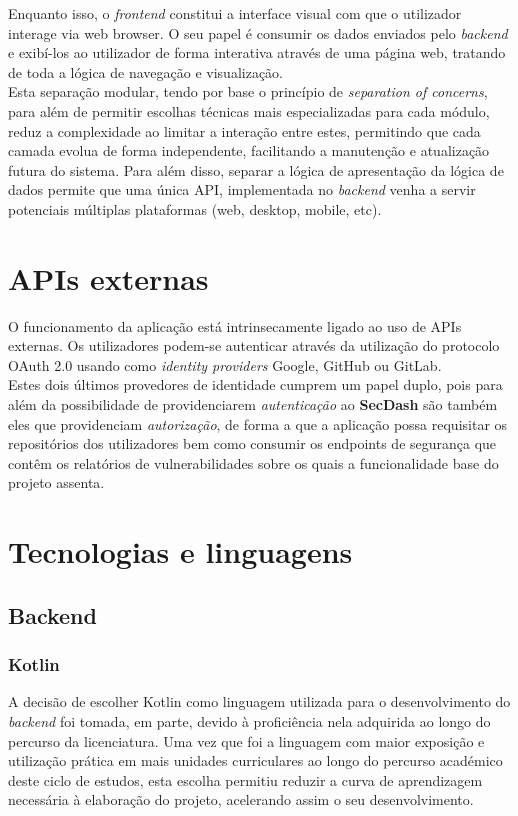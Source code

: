 Enquanto isso, o \textit{frontend} constitui a interface visual com que o utilizador interage via web browser. O seu papel é consumir os dados enviados pelo \textit{backend} e exibí-los ao utilizador de forma interativa através de uma página web, tratando de toda a lógica de navegação e visualização. \\

Esta separação modular, tendo por base o princípio de \textit{separation of concerns}, para além de permitir escolhas técnicas mais especializadas para cada módulo, reduz a complexidade ao limitar a interação entre estes, permitindo que cada camada evolua de forma independente, facilitando a manutenção e atualização futura do sistema. Para além disso, separar a lógica de apresentação da lógica de dados permite que uma única API, implementada no \textit{backend} venha a servir potenciais múltiplas plataformas (web, desktop, mobile, etc). \\


\section{APIs externas} \label{arquitetura:apis}
O funcionamento da aplicação está intrinsecamente ligado ao uso de APIs externas.  Os utilizadores podem-se autenticar através da utilização do protocolo OAuth 2.0 usando como \textit{identity providers} Google, GitHub ou GitLab. \\

Estes dois últimos provedores de identidade cumprem um papel duplo, pois para além da possibilidade de providenciarem \textit{autenticação} ao \textbf{SecDash} são também eles que providenciam \textit{autorização}, de forma a que a aplicação possa requisitar os repositórios dos utilizadores bem como consumir os endpoints de segurança que contêm os relatórios de vulnerabilidades sobre os quais a funcionalidade base do projeto assenta. \\

\section{Tecnologias e linguagens} \label{arquitetura:tecnologias}
\subsection{Backend} \label{arquitetura:tecnologias:backend}
\subsubsection{Kotlin}
A decisão de escolher Kotlin como linguagem utilizada para o desenvolvimento do \textit{backend} foi tomada, em parte, devido à proficiência nela adquirida ao longo do percurso da licenciatura. Uma vez que foi a linguagem com maior exposição e utilização prática em mais unidades curriculares ao longo do percurso académico deste ciclo de estudos, esta escolha permitiu reduzir a curva de aprendizagem necessária à elaboração do projeto, acelerando assim o seu desenvolvimento. \\

